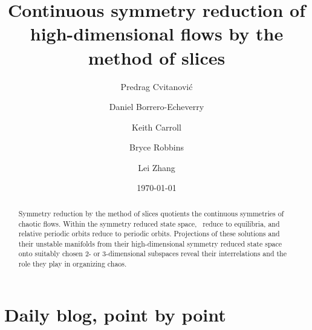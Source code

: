 \documentclass[twocolumn,
secnumarabic,
nofootinbib, tightenlines,
nobibnotes, showkeys, aps, showpacs,
cha]{revtex4-1}
\begin{document}
\title[Symmetry reduction by the method of slices]
{Continuous symmetry reduction of high-dimensional flows
 by the method of slices}


\author{Predrag Cvitanovi{\'c}}
\author{Daniel Borrero-Echeverry}
\author{Keith Carroll}
\author{Bryce Robbins}
\author{Lei Zhang}

\date{\today}

\begin{abstract}
Symmetry reduction by the method of slices quotients the continuous
symmetries of chaotic flows. Within the symmetry reduced state space,
\reqva\ reduce to equilibria, and relative periodic orbits reduce to
periodic orbits. Projections of these solutions and their unstable
manifolds from their high-dimensional symmetry reduced state space onto
suitably chosen 2- or 3-dimensional subspaces reveal their interrelations
and the role they play in organizing chaos.

\end{abstract}


\maketitle









% 


\ifdraft
    \onecolumngrid

    \newpage

    \newpage

    \newpage
    \section{Daily blog, point by point}
    \label{chap:atlas}

\fi
\end{document}
